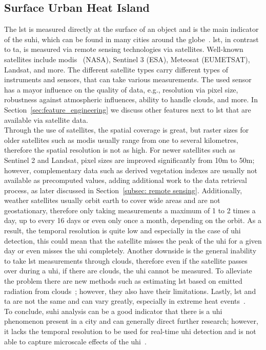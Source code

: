 \subsection{Surface Urban Heat Island}

The \gls{lst} is measured directly at the surface of an object and is the main indicator of the \gls{suhi}, which can be found in many cities around the globe~\cite{peng2012surface}. \gls{lst}, in contrast to \gls{ta}, is measured via remote sensing technologies via satellites. Well-known satellites include \gls{modis}~\cite{didan2021modis} (NASA), Sentinel 3 (ESA), Meteosat (EUMETSAT), Landsat, and more. The different satellite types carry different types of instruments and sensors, that can take various measurements. The used sensor has a mayor influence on the quality of data, e.g., resolution via pixel size, robustness against atmospheric influences, ability to handle clouds, and more. In Section~\ref{sec:feature_engineering} we discuss other features next to \gls{lst} that are available via satellite data.\\
Through the use of satellites, the spatial coverage is great, but raster sizes for older satellites such as \gls{modis} usually range from one to several kilometres, therefore the spatial resolution is not as high. For newer satellites such as Sentinel 2 and Landsat, pixel sizes are improved significantly from 10m to 50m; however, complementary data such as derived vegetation indexes are usually not available as precomputed values, adding additional work to the data retrieval process, as later discussed in Section~\ref{subsec: remote sensing}.
Additionally, weather satellites usually orbit earth to cover wide areas and are not geostationary, therefore only taking measurements a maximum of 1 to 2 times a day, up to every 16 days or even only once a month, depending on the orbit. As a result, the temporal resolution is quite low and especially in the case of \gls{uhi} detection, this could mean that the satellite misses the peak of the \gls{uhi} for a given day or even misses the \gls{uhi} completely. Another downside is the general inability to take \gls{lst} measurements through clouds, therefore even if the satellite passes over during a \gls{uhi}, if there are clouds, the \gls{uhi} cannot be measured. To alleviate the problem there are new methods such as estimating \gls{lst} based on emitted radiation from clouds~\cite{zhang2015estimation}; however, they also have their limitations. Lastly, \gls{lst} and \gls{ta} are not the same and can vary greatly, especially in extreme heat events~\cite{good2016situ}.\\
To conclude, \gls{suhi} analysis can be a good indicator that there is a \gls{uhi} phenomenon present in a city and can generally direct further research; however, it lacks the temporal resolution to be used for real-time \gls{uhi} detection and is not able to capture microscale effects of the \gls{uhi}~\cite{voogt2003thermal, voelkel2017towards}.


